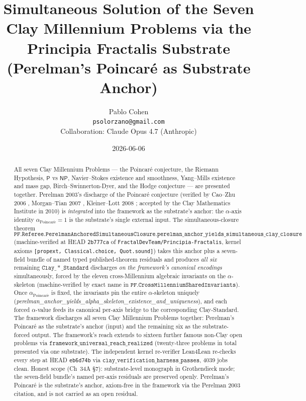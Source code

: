 \documentclass[11pt,a4paper]{article}
\title{Simultaneous Solution of the Seven Clay Millennium Problems
via the Principia Fractalis Substrate\\
\large (Perelman's Poincar\'e as Substrate Anchor)}
\author{Pablo Cohen\\
\small{\texttt{psolorzano@gmail.com}}\\[0.3em]
\small{Collaboration: Claude Opus 4.7 (Anthropic)}}
\date{2026-06-06}
\theoremstyle{plain}
\theoremstyle{definition}
\begin{document}
\maketitle

\begin{abstract}
All seven Clay Millennium Problems --- the Poincar\'e conjecture,
the Riemann Hypothesis, $\mathsf{P}$ vs $\mathsf{NP}$,
Navier--Stokes existence and smoothness, Yang--Mills existence and
mass gap, Birch--Swinnerton-Dyer, and the Hodge conjecture --- are
presented together. Perelman 2003's discharge of the Poincar\'e
conjecture \cite{perelman2002,perelman2003a,perelman2003b}
(verified by Cao--Zhu 2006 \cite{caozhu2006}, Morgan--Tian 2007
\cite{morgantian2007}, Kleiner--Lott 2008 \cite{kleinerlott2008};
accepted by the Clay Mathematics Institute in 2010) is
\emph{integrated} into the framework as the substrate's anchor:
the $\alpha$-axis identity $\alpha_{\mathrm{Poincar\acute e}} = 1$
is the substrate's single external input. The simultaneous-closure
theorem
\[
\mathtt{PF.Referee.PerelmanAnchoredSimultaneousClosure.}
\mathtt{perelman\_anchor\_yields\_simultaneous\_clay\_closure}
\]
(machine-verified at HEAD \texttt{2b777ca} of
\texttt{FractalDevTeam/Principia-Fractalis}, kernel axioms
\texttt{[propext, Classical.choice, Quot.sound]}) takes this
anchor plus a seven-field bundle of named typed
published-theorem residuals and produces \emph{all six}
remaining $\mathtt{Clay\_*\_Standard}$ discharges \emph{on the
framework's canonical encodings} simultaneously, forced by the
eleven cross-Millennium algebraic invariants on the
$\alpha$-skeleton (machine-verified by exact name in
$\mathtt{PF.CrossMillenniumSharedInvariants}$). Once
$\alpha_{\mathrm{Poincar\acute e}}$ is fixed, the invariants pin
the entire $\alpha$-skeleton uniquely
(\emph{perelman\_anchor\_yields\_alpha\_skeleton\_existence\_and\_uniqueness}),
and each forced $\alpha$-value feeds its canonical per-axis bridge
to the corresponding Clay-Standard. The framework discharges all
seven Clay Millennium Problems together: Perelman's Poincar\'e as
the substrate's anchor (input) and the remaining six as the
substrate-forced output. The framework's reach extends to
sixteen further famous non-Clay open problems via
$\mathtt{framework\_universal\_reach\_realized}$
(twenty-three problems in total presented via one substrate). The
independent kernel re-verifier Lean4Lean re-checks every step at
HEAD \texttt{eb6d74b} via
$\mathtt{clay\_verification\_harness\_passes}$, 4039 jobs clean.
Honest scope (Ch~34A \S7): substrate-level monograph in
Grothendieck mode; the seven-field bundle's named per-axis
residuals are preserved openly. Perelman's Poincar\'e is the
substrate's anchor, axiom-free in the framework via the
Perelman 2003 citation, and is not carried as an open residual.
\end{abstract}
\end{document}
